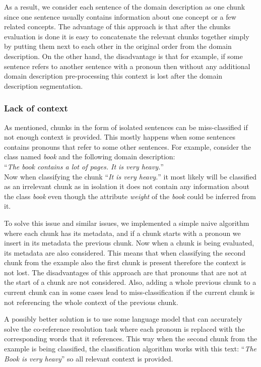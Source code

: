 As a result, we consider each sentence of the domain description as one chunk since one sentence usually contains information about one concept or a few related concepts. The advantage of this approach is that after the chunks evaluation is done it is easy to concatenate the relevant chunks together simply by putting them next to each other in the original order from the domain description. On the other hand, the disadvantage is that for example, if some sentence refers to another sentence with a pronoun then without any additional domain description pre-processing this context is lost after the domain description segmentation.


\subsubsection{Lack of context}

As mentioned, chunks in the form of isolated sentences can be miss-classified if not enough context is provided. This mostly happens when some sentences contains pronouns that refer to some other sentences. For example, consider the class named \textit{book} and the following domain description: \\

\noindent{}``\textit{The book contains a lot of pages. It is very heavy.}'' \\

\noindent{}Now when classifying the chunk ``\textit{It is very heavy.}'' it most likely will be classified as an irrelevant chunk as in isolation it does not contain any information about the class \textit{book} even though the attribute \textit{weight} of the \textit{book} could be inferred from it.

To solve this issue and similar issues, we implemented a simple naive algorithm where each chunk has its metadata, and if a chunk starts with a pronoun we insert in its metadata the previous chunk. Now when a chunk is being evaluated, its metadata are also considered. This means that when classifying the second chunk from the example also the first chunk is present therefore the context is not lost. The disadvantages of this approach are that pronouns that are not at the start of a chunk are not considered. Also, adding a whole previous chunk to a current chunk can in some cases lead to miss-classification if the current chunk is not referencing the whole context of the previous chunk.

A possibly better solution is to use some language model that can accurately solve the co-reference resolution task where each pronoun is replaced with the corresponding words that it references. This way when the second chunk from the example is being classified, the classification algorithm works with this text: ``\textit{The Book is very heavy}'' so all relevant context is provided. \\

